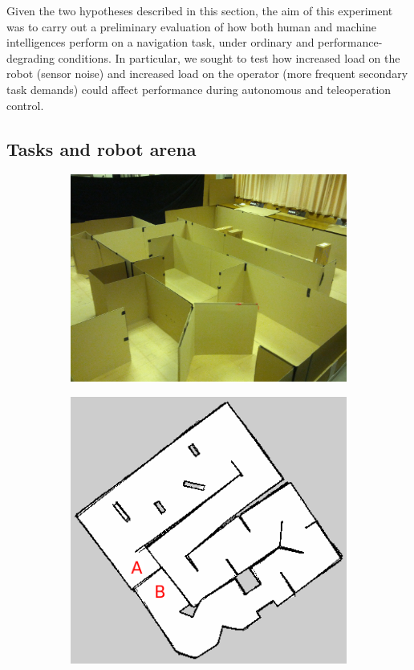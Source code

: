 \documentclass[a4paper,12pt,oneside,openright]{bhamthesis}
\begin{document}
Given the two hypotheses described in this section, the aim of this experiment was to carry out a preliminary evaluation of how both human and machine intelligences perform on a navigation task, under ordinary and performance-degrading conditions. In particular, we sought to test how increased load on the robot (sensor noise) and increased load on the operator (more frequent secondary task demands) could affect performance during autonomous and teleoperation control.  

\subsection{Tasks and robot arena}

\begin{figure}
	\centering
	\begin{subfigure}[b]{0.5\textwidth}
		\centering
		\includegraphics[width=\textwidth]{chapter3_fig/arena_pilot.jpg}
		\label{subfig:arena1_pilot}
	\end{subfigure}
	\hfill
	\begin{subfigure}[b]{0.45\textwidth}
		\centering
		\includegraphics[width=\textwidth]{chapter3_fig/map_pilot.png}

\end{subfigure}
\end{figure}
\end{document}
